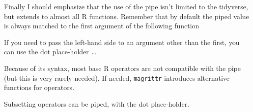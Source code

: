 \documentclass[]{book}
\newenvironment{Shaded}{}{}
\newcommand{\CommentTok}[1]{\textcolor[rgb]{0.38,0.63,0.69}{\textit{#1}}}
\newcommand{\DecValTok}[1]{\textcolor[rgb]{0.25,0.63,0.44}{#1}}
\newcommand{\KeywordTok}[1]{\textcolor[rgb]{0.00,0.44,0.13}{\textbf{#1}}}
\newcommand{\NormalTok}[1]{#1}
\newcommand{\OperatorTok}[1]{\textcolor[rgb]{0.40,0.40,0.40}{#1}}
\newcommand{\StringTok}[1]{\textcolor[rgb]{0.25,0.44,0.63}{#1}}
\begin{document}
Finally I should emphasize that the use of the pipe isn't limited to the
tidyverse, but extends to almost all R functions. Remember that by default
the piped value is always matched to the first argument of the following
function

\begin{Shaded}
\end{Shaded}

If you need to pass the left-hand side to an argument other than the first,
you can use the dot place-holder \texttt{.}.

\begin{Shaded}
\end{Shaded}

Because of its syntax, most base R operators are not compatible with the pipe
(but this is very rarely needed).
If needed, \texttt{magrittr} introduces alternative functions for operators.

Subsetting operators can be piped, with the dot place-holder.

\begin{Shaded}
\end{Shaded}
\end{document}
